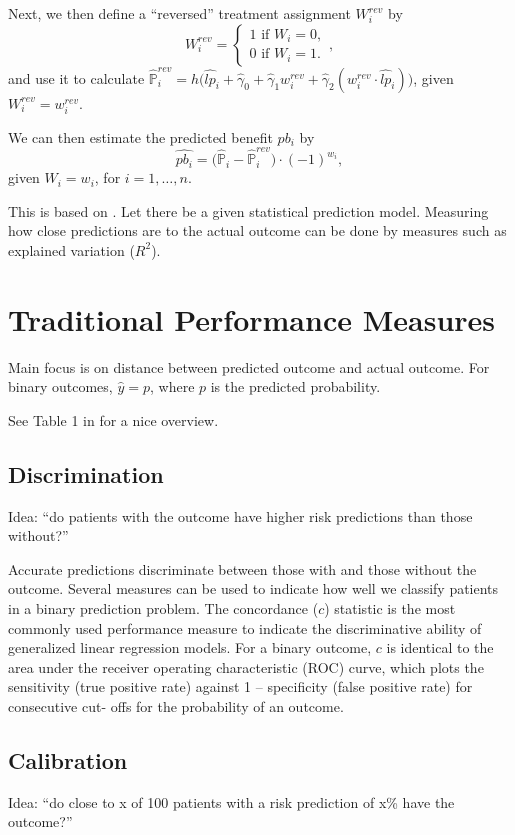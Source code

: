\documentclass[12pt]{article}
\begin{document}
Next, we then define a ``reversed'' treatment assignment $W_i^{rev}$ by  
\[
	W_i^{rev} = 
	\begin{cases}
	1 \text{ if } W_i=0,\\
	0 \text{ if } W_i=1.  
	\end{cases},
\]
and use it to calculate $\widehat{\mathbb{P}}_i^{rev} = h\Big( 
	\widehat{lp}_i + \hat{\gamma}_0 + \hat{\gamma}_1 w_i^{rev} + \hat{\gamma}_2 (w_i^{rev} \cdot \widehat{lp}_i)
	\Big)$, given $W_i^{rev} = w_i^{rev}$.
	
We can then estimate the predicted benefit $pb_i$ by
\[
	\widehat{pb_i} = 
	\big(\widehat{\mathbb{P}}_i - 
	\widehat{\mathbb{P}}_i^{rev}
	\big) 
	\cdot
	(-1)^{w_i},
\]
given $W_i = w_i$, for $i=1,\dots,n$.

\newpage
This is based on \cite{steyerberg2010}. Let there be a given statistical prediction model. Measuring how close predictions are to the actual outcome can be done by measures such as explained variation ($R^2$). 


\section{Traditional Performance Measures}
Main focus is on distance between predicted outcome and actual outcome. For binary outcomes, $\hat{y} = p$, where $p$ is the predicted probability. 

See Table 1 in \cite{steyerberg2010} for a nice overview.

\subsection{Discrimination}
Idea: ``do patients with the outcome have higher risk predictions than those without?''

Accurate predictions discriminate between those with and those without the outcome. Several measures can be used to indicate how well we classify patients in a binary prediction problem. The concordance ($c$) statistic is the most commonly used performance measure to indicate the discriminative ability of generalized linear regression models. For a binary outcome, $c$ is identical to the area under the receiver operating characteristic (ROC) curve, which plots the sensitivity (true positive rate) against 1 – specificity (false positive rate) for consecutive cut- offs for the probability of an outcome.

\subsection{Calibration}
Idea: ``do close to x of 100 patients
with a risk prediction of x\% have the outcome?''
\end{document}
